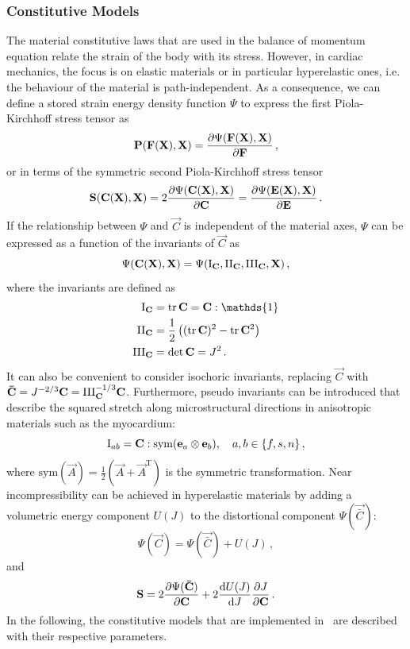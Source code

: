 \subsubsection{Constitutive Models}

The material constitutive laws that are used in the balance of momentum equation relate the strain of the body with its stress.
However, in cardiac mechanics, the focus is on elastic materials or in particular hyperelastic ones, i.e. the behaviour of the material is path-independent.
As a consequence, we can define a stored strain energy density function $\Psi$ to express the first Piola-Kirchhoff stress tensor as 
\begin{equation}
    \vec P (\vec F (\vec X), \vec X) = \pdv{\Psi (\vec F (\vec X), \vec X)}{\vec F} \,,
\end{equation}
or in terms of the symmetric second Piola-Kirchhoff stress tensor 
\begin{equation}
    \vec S (\vec C (\vec X), \vec X) = 2 \pdv{\Psi(\vec C (\vec X), \vec X)}{\vec C} = \pdv{\Psi(\vec E (\vec X), \vec X)}{\vec E} \,.
\end{equation}
If the relationship between $\Psi$ and $\vec C$ is independent of the material axes, $\Psi$ can be expressed as a function of the invariants of $\vec C$ as 
\begin{equation}
    \Psi(\vec C (\vec X), \vec X) = \Psi(\I{C},\II{C},\III{C}, \vec X) \,,
\end{equation}
where the invariants are defined as 
\begin{align}
    \I{C} &= \tr\vec C = \vec C : \mathds{1} \\
    \II{C} &= \frac{1}{2} \left( (\tr \vec C)^2 - \tr \vec C^2 \right) \\
    \III{C} &= \det\vec C = J^2 \,.
\end{align}
It can also be convenient to consider isochoric invariants, replacing $\vec C$ with $\vec{\bar{C}} = J^{-2/3} \vec C = \III{C}^{-1/3} \vec C$.
Furthermore, pseudo invariants can be introduced that describe the squared stretch along microstructural directions in anisotropic materials such as the myocardium:
\begin{equation}
    \mathrm{I}_{ab} = \vec C : \text{sym}(\vec e_a \otimes \vec e_b) \qc a,b \in \{f,s,n\} \,,
\end{equation}
where $\text{sym}(\vec A) = \frac{1}{2} (\vec A + \vec A^\mathrm{T})$ is the symmetric transformation.
Near incompressibility can be achieved in hyperelastic materials by adding a volumetric energy component $U(J)$ to the distortional component $\Psi (\vec{\bar{C}} )$:
\begin{equation}
    \Psi(\vec C) = \Psi (\vec{\bar{C}} ) + U(J) \,,
\end{equation}
and 
\begin{equation}
    \vec S = 2 \pdv{\Psi (\vec{\bar{C}} )}{\vec C} + 2 \dv{U(J)}{J}\pdv{J}{\vec C}  \,.
\end{equation}
In the following, the constitutive models that are implemented in \CM~are described with their respective parameters.

